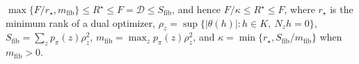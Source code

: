 \(\max\{F/r_{\star},m_{\mathrm{fib}}\}\le R^{\star}\le F=\mathcal D\le S_{\mathrm{fib}}\), and hence \(F/\kappa\le R^{\star}\le F\), where \(r_{\star}\) is the minimum rank of a dual optimizer, \(\rho_z=\sup\{|\theta(h)|:h\in K,\ N_zh=0\}\), \(S_{\mathrm{fib}}=\sum_zp_{\pi}(z)\rho_z^2\), \(m_{\mathrm{fib}}=\max_zp_{\pi}(z)\rho_z^2\), and \(\kappa=\min\{r_{\star},S_{\mathrm{fib}}/m_{\mathrm{fib}}\}\) when \(m_{\mathrm{fib}}>0\).